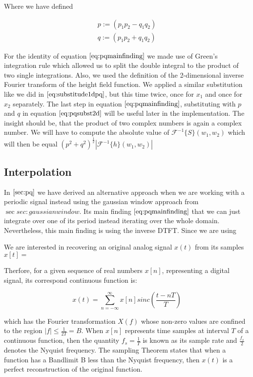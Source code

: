 Where we have defined 

\begin{align}
p := (p_1 p_2 - q_1 q_2) \nonumber \\ 
q := (p_1 p_2 + q_1 q_2)
\label{eq:pqsubst2d}
\end{align}

For the identity of equation $\ref{eq:pqmainfinding}$ we made use of Green's integration rule which allowed us to split the double integral to the product of two single integrations. Also, we used the definition of the 2-dimensional inverse Fourier transform of the height field function. We applied a similar substitution like we did in $\ref{eq:substitude1dpq}$, but this time twice, once for $x_1$ and once for $x_2$ separately. The last step in equation $\ref{eq:pqmainfinding}$, substituting with $p$ and $q$ in equation $\ref{eq:pqsubst2d}$ will be useful later in the implementation. The insight should be, that the product of two complex numbers is again a complex number. We will have to compute the absolute value of $\mathcal{F}^{-1}\{S\}(w_1,w_2)$ which will then be equal $(p^2 + q^2)^{\frac{1}{2}}\left|\mathcal{F}^{-1}\{h\}(w_1,w_2)\right|$


\subsection{Interpolation}
\label{sec:sincinterpolation}

In $\ref{sec:pq}$ we have derived an alternative approach when we are working with a periodic signal instead using the gaussian window approach from $\sec{sec:gaussianwindow}$. Its main finding $\ref{eq:pqmainfinding}$ that we can just integrate over one of its period instead iterating over the whole domain. Nevertheless, this main finding is using the inverse DTFT. Since we are using 

We are interested in recovering an original analog signal $x(t)$ from its samples $x[t] = $ 

Therfore, for a given sequence of real numbers $x[n]$, representing a digital signal, its correspond continuous function is: 

\begin{equation}
  x(t) = \sum_{n=-\infty}^{\infty} x[n] sinc\left(\frac{t-nT}{T}\right)
\end{equation}

which has the Fourier transformation $X(f)$ whose non-zero values are confined to the region $|f| \leq \frac{1}{2T} = B$.
When $x[n]$ represents time samples at interval $T$ of a continuous function, then the quantity $f_s = \frac{1}{T}$ is known as its sample rate and $\frac{f_s}{2}$ denotes the Nyquist frequency. The sampling Theorem states that when a function has a Bandlimit B less than the Nyquist frequency, then $x(t)$ is a perfect reconstruction of the original function. 

